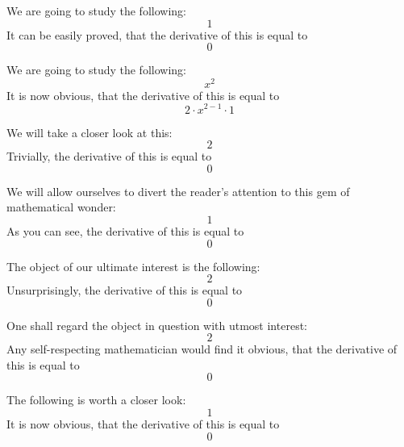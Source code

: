 \documentclass{article}
\begin{document}
We are going to study the following:
\begin{equation}
1 
\end{equation}
It can be easily proved, that the derivative of this is equal to
\begin{equation}
0 
\end{equation}

We are going to study the following:
\begin{equation}
x ^{2 } 
\end{equation}
It is now obvious, that the derivative of this is equal to
\begin{equation}
2 \cdot x ^{2 - 1 } \cdot 1 
\end{equation}

We will take a closer look at this:
\begin{equation}
2 
\end{equation}
Trivially, the derivative of this is equal to
\begin{equation}
0 
\end{equation}

We will allow ourselves to divert the reader's attention to this gem of mathematical wonder:
\begin{equation}
1 
\end{equation}
As you can see, the derivative of this is equal to
\begin{equation}
0 
\end{equation}

The object of our ultimate interest is the following:
\begin{equation}
2 
\end{equation}
Unsurprisingly, the derivative of this is equal to
\begin{equation}
0 
\end{equation}

One shall regard the object in question with utmost interest:
\begin{equation}
2 
\end{equation}
Any self-respecting mathematician would find it obvious, that the derivative of this is equal to
\begin{equation}
0 
\end{equation}

The following is worth a closer look:
\begin{equation}
1 
\end{equation}
It is now obvious, that the derivative of this is equal to
\begin{equation}
0 
\end{equation}
\end{document}
